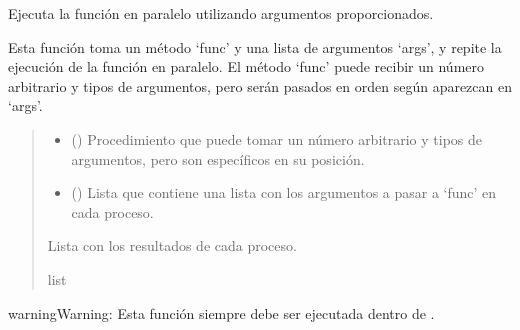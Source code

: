 \documentclass[letterpaper,10pt,english]{sphinxmanual}
\begin{document}

\begin{fulllineitems}
\label{\detokenize{myutils:myutils.run_in_parallel}}
\pysigstartsignatures
{}
\pysigstopsignatures
\sphinxAtStartPar
Ejecuta la función en paralelo utilizando argumentos proporcionados.

\sphinxAtStartPar
Esta función toma un método ‘func’ y una lista de argumentos ‘args’, y repite la ejecución
de la función en paralelo. El método ‘func’ puede recibir un número arbitrario y tipos de argumentos,
pero serán pasados en orden según aparezcan en ‘args’.
\begin{quote}\begin{description}
\begin{itemize}
\item {} 
\sphinxAtStartPar
{} () \textendash{} Procedimiento que puede tomar un número arbitrario y tipos de argumentos, pero son específicos
en su posición.

\item {} 
\sphinxAtStartPar
{} () \textendash{} Lista que contiene una lista con los argumentos a pasar a ‘func’ en cada proceso.

\end{itemize}

\sphinxAtStartPar
Lista con los resultados de cada proceso.

\sphinxAtStartPar
list

\end{description}\end{quote}

\begin{sphinxadmonition}{warning}{Warning:}
\sphinxAtStartPar
Esta función siempre debe ser ejecutada dentro de .
\end{sphinxadmonition}

\end{fulllineitems}
\end{document}
